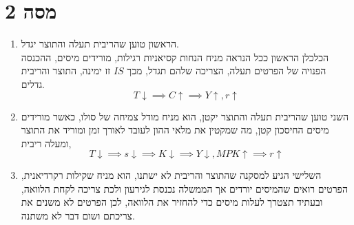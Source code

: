 \documentclass[12pt]{article}
\begin{document}
\section*{מסה 2}
\begin{enumerate}
    \item הראשון טוען שהריבית תעלה והתוצר יגדל. \\
    הכלכלן הראשון ככל הנראה מניח הנחות קסיאניות רגילות, מורידים מיסים, ההכנסה הפנויה של הפרטים תעלה, הצריכה שלהם תגדל, מכך $IS$ זז ימינה, התוצר והריבית גדלים. \begin{equation*}
        T \downarrow \implies C \uparrow \implies Y \uparrow, r \uparrow
    \end{equation*}
    \item השני טוען שהריבית תעלה והתוצר יקטן, הוא מניח מודל צמיחה של סולו, כאשר מורידים מיסים החיסכון קטן, מה שמקטין את מלאי ההון לעובד לאורך זמן  ומוריד את התוצר ומעלה ריבית,
    \begin{equation*}
        T \downarrow \implies s \downarrow \implies K \downarrow \implies Y \downarrow, MPK \uparrow \implies r \uparrow
    \end{equation*}
    \item השלישי הגיע למסקנה שהתוצר והריבית לא ישתנו, הוא מניח שקילות רקרדיאנית, הפרטים רואים שהמיסים יורדים אך הממשלה נכנסת לגירעון ולכת צריכה לקחת הלוואה, ובעתיד תצטרך לעלות מיסים כדי להחזיר את הלוואה, לכן הפרטים לא משנים את צריכתם ושום דבר לא משתנה.
\end{enumerate}
\end{document}
